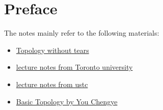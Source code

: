 \chapter*{Preface}

The notes mainly refer to the following materials:
\begin{itemize}
    \item \href{https://www.topologywithouttears.net/}{Topology without tears}
    \item \href{https://www.math.toronto.edu/ivan/mat327/?resources}{lecture notes from Toronto university}
    \item \href{http://staff.ustc.edu.cn/~wangzuoq/Courses/21S-Topology/}{lecture notes from ustc}
    \item \href{}{Basic Topology by You Chengye}
\end{itemize}

